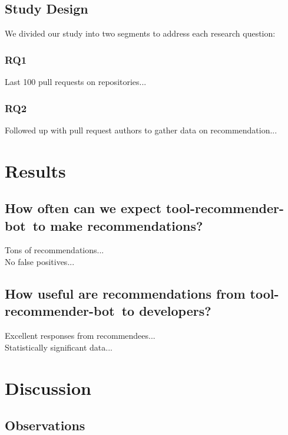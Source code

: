 \documentclass[conference]{IEEEtran}
\newcommand{\tool}{tool-recommender-bot}
\begin{document}
\subsection{Study Design}

We divided our study into two segments to address each research question:

\subsubsection{RQ1}

Last 100 pull requests on repositories...

\subsubsection{RQ2}

Followed up with pull request authors to gather data on recommendation...

\section{Results}

\subsection{How often can we expect \tool~to make recommendations?}

Tons of recommendations... \\

No false positives... \\

\subsection{How useful are recommendations from \tool~to developers?}

Excellent responses from recommendees...\\

Statistically significant data...

\section{Discussion}

\subsection{Observations}
\end{document}
